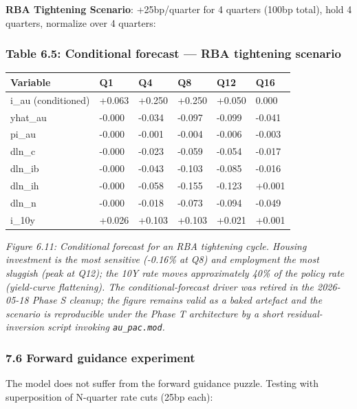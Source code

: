 \documentclass[
]{article}
\newcounter{none} %
\begin{document}
\textbf{RBA Tightening Scenario}: +25bp/quarter for 4 quarters (100bp
total), hold 4 quarters, normalize over 4 quarters:

\subsubsection{Table 6.5: Conditional forecast --- RBA tightening
scenario}\label{table-6.5-conditional-forecast-rba-tightening-scenario}

{\def\LTcaptype{none} %
\begin{longtable}[]{@{}llllll@{}}
\toprule\noalign{}
Variable & Q1 & Q4 & Q8 & Q12 & Q16 \\
\midrule\noalign{}
\endhead
\bottomrule\noalign{}
\endlastfoot
i\_au (conditioned) & +0.063 & +0.250 & +0.250 & +0.050 & 0.000 \\
yhat\_au & -0.000 & -0.034 & -0.097 & -0.099 & -0.041 \\
pi\_au & -0.000 & -0.001 & -0.004 & -0.006 & -0.003 \\
dln\_c & -0.000 & -0.023 & -0.059 & -0.054 & -0.017 \\
dln\_ib & -0.000 & -0.043 & -0.103 & -0.085 & -0.016 \\
dln\_ih & -0.000 & -0.058 & -0.155 & -0.123 & +0.001 \\
dln\_n & -0.000 & -0.018 & -0.073 & -0.094 & -0.049 \\
i\_10y & +0.026 & +0.103 & +0.103 & +0.021 & +0.001 \\
\end{longtable}
}

\emph{Figure 6.11: Conditional forecast for an RBA tightening cycle.
Housing investment is the most sensitive (-0.16\% at Q8) and employment
the most sluggish (peak at Q12); the 10Y rate moves approximately 40\%
of the policy rate (yield-curve flattening). The conditional-forecast
driver was retired in the 2026-05-18 Phase S cleanup; the figure remains
valid as a baked artefact and the scenario is reproducible under the
Phase T architecture by a short residual-inversion script invoking
\texttt{au\_pac.mod}.}

\subsubsection{7.6 Forward guidance
experiment}\label{forward-guidance-experiment}

The model does not suffer from the forward guidance puzzle. Testing with
superposition of N-quarter rate cuts (25bp each):
\end{document}
